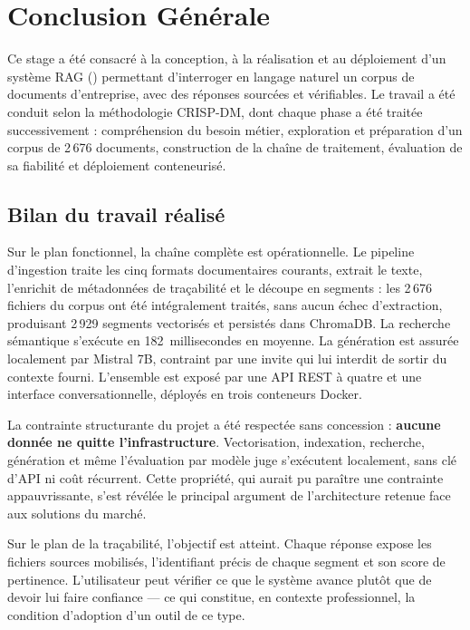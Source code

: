 \chapter*{Conclusion Générale}

Ce stage a été consacré à la conception, à la réalisation et au déploiement d'un
système RAG () permettant d'interroger en
langage naturel un corpus de documents d'entreprise, avec des réponses sourcées
et vérifiables. Le travail a été conduit selon la méthodologie CRISP-DM, dont
chaque phase a été traitée successivement : compréhension du besoin métier,
exploration et préparation d'un corpus de 2\,676 documents, construction de la
chaîne de traitement, évaluation de sa fiabilité et déploiement conteneurisé.

\section*{Bilan du travail réalisé}

Sur le plan fonctionnel, la chaîne complète est opérationnelle. Le pipeline
d'ingestion traite les cinq formats documentaires courants, extrait le texte,
l'enrichit de métadonnées de traçabilité et le découpe en segments : les 2\,676
fichiers du corpus ont été intégralement traités, sans aucun échec d'extraction,
produisant 2\,929 segments vectorisés et persistés dans ChromaDB. La recherche
sémantique s'exécute en 182~millisecondes en moyenne. La génération est assurée
localement par Mistral 7B, contraint par une invite qui lui interdit de sortir du
contexte fourni. L'ensemble est exposé par une API REST à quatre
 et une interface conversationnelle, déployés en trois conteneurs
Docker.

La contrainte structurante du projet a été respectée sans concession :
\textbf{aucune donnée ne quitte l'infrastructure}. Vectorisation, indexation,
recherche, génération et même l'évaluation par modèle juge s'exécutent
localement, sans clé d'API ni coût récurrent. Cette propriété, qui aurait pu
paraître une contrainte appauvrissante, s'est révélée le principal argument de
l'architecture retenue face aux solutions du marché.

Sur le plan de la traçabilité, l'objectif est atteint. Chaque réponse expose les
fichiers sources mobilisés, l'identifiant précis de chaque segment et son score
de pertinence. L'utilisateur peut vérifier ce que le système avance plutôt que de
devoir lui faire confiance --- ce qui constitue, en contexte professionnel, la
condition d'adoption d'un outil de ce type.

